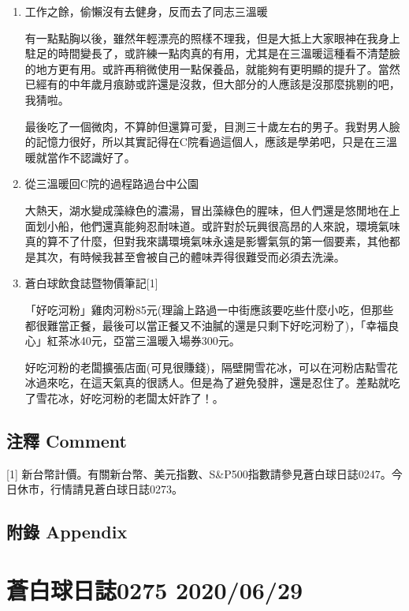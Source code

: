 \documentclass[
]{article}
\begin{document}
\begin{enumerate}
\def\labelenumi{\arabic{enumi}.}
\item
  工作之餘，偷懶沒有去健身，反而去了同志三溫暖

  有一點點胸以後，雖然年輕漂亮的照樣不理我，但是大抵上大家眼神在我身上駐足的時間變長了，或許練一點肉真的有用，尤其是在三溫暖這種看不清楚臉的地方更有用。或許再稍微使用一點保養品，就能夠有更明顯的提升了。當然已經有的中年歲月痕跡或許還是沒救，但大部分的人應該是沒那麼挑剔的吧，我猜啦。

  最後吃了一個微肉，不算帥但還算可愛，目測三十歲左右的男子。我對男人臉的記憶力很好，所以其實記得在C院看過這個人，應該是學弟吧，只是在三溫暖就當作不認識好了。
\item
  從三溫暖回C院的過程路過台中公園

  大熱天，湖水變成藻綠色的濃湯，冒出藻綠色的腥味，但人們還是悠閒地在上面划小船，他們還真能夠忍耐味道。或許對於玩興很高昂的人來說，環境氣味真的算不了什麼，但對我來講環境氣味永遠是影響氣氛的第一個要素，其他都是其次，有時候我甚至會被自己的體味弄得很難受而必須去洗澡。
\item
  蒼白球飲食誌暨物價筆記{[}1{]}

  「好吃河粉」雞肉河粉85元(理論上路過一中街應該要吃些什麼小吃，但那些都很難當正餐，最後可以當正餐又不油膩的還是只剩下好吃河粉了)，「幸福良心」紅茶冰40元，亞當三溫暖入場券300元。

  好吃河粉的老闆擴張店面(可見很賺錢)，隔壁開雪花冰，可以在河粉店點雪花冰過來吃，在這天氣真的很誘人。但是為了避免發胖，還是忍住了。差點就吃了雪花冰，好吃河粉的老闆太奸詐了！。
\end{enumerate}

\hypertarget{ux6ce8ux91cb-comment-23}{%
\subsection{注釋 Comment}\label{ux6ce8ux91cb-comment-23}}

{[}1{]}
新台幣計價。有關新台幣、美元指數、S\&P500指數請參見蒼白球日誌0247。今日休市，行情請見蒼白球日誌0273。

\hypertarget{ux9644ux9304-appendix-23}{%
\subsection{附錄 Appendix}\label{ux9644ux9304-appendix-23}}

\hypertarget{ux84bcux767dux7403ux65e5ux8a8c0275-20200629}{%
\section{蒼白球日誌0275
2020/06/29}\label{ux84bcux767dux7403ux65e5ux8a8c0275-20200629}}
\end{document}
